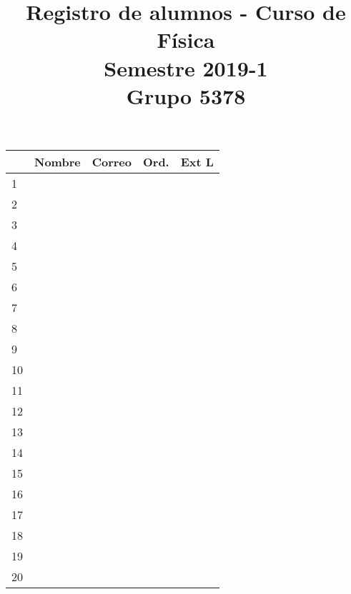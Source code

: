 \documentclass[11pt]{article}
\title{Registro de alumnos - Curso de Física \\ Semestre 2019-1   \\ Grupo 5378}
\date{ }
\begin{document}
\maketitle
\fontsize{12}{12}\selectfont
\begin{tabular}{| l | >{\centering\arraybackslash}m{7cm}| >{\centering\arraybackslash}m{5cm} | c | c |}
\hline
 & Nombre & Correo & Ord. & Ext L \\
\hline 1 & & & & \\
\hline 2 & & & &  \\
\hline 3 & & & &  \\
\hline 4 & & & &  \\
\hline 5 & & & &  \\
\hline 6 & & & &  \\
\hline 7 & & & &  \\
\hline 8 & & & &  \\
\hline 9 & & & &  \\
\hline 10 & & & &  \\
\hline 11 & & & &  \\
\hline 12 & & & &  \\
\hline 13 & & & &  \\
\hline 14 & & & &  \\
\hline 15 & & & &  \\
\hline 16 & & & &  \\
\hline 17 & & & &  \\
\hline 18 & & & &  \\
\hline 19 & & & &  \\
\hline 20 & & & &  \\
\hline
\end{tabular}
\end{document}
